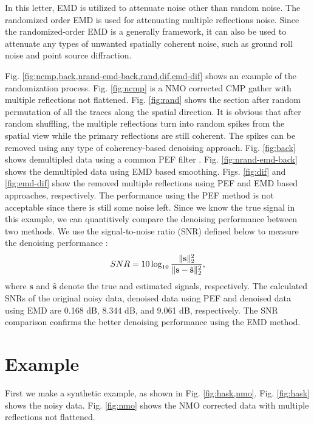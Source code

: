 In this letter, EMD is utilized to attenuate noise other than random noise. The randomized order EMD is used for attenuating multiple reflections noise. Since the randomized-order EMD is a generally framework, it can also be used to attenuate any types of unwanted spatially coherent noise, such as ground roll noise \cite{yangkang2015orthogroll} and point source diffraction.

Fig. \ref{fig:ncmp,back,nrand-emd-back,rand,dif,emd-dif} shows an example of the randomization process. Fig. \ref{fig:ncmp} is a NMO corrected CMP gather with multiple reflections not flattened. Fig.  \ref{fig:rand} shows the section after random permutation of all the traces along the spatial direction. It is obvious that after random shuffling, the multiple reflections turn into random spikes from the spatial view while the primary reflections are still coherent. The spikes can be removed using any type of coherency-based denoising approach. Fig. \ref{fig:back} shows demultipled data using a common PEF filter \cite{Abma1995}. Fig. \ref{fig:nrand-emd-back} shows the demultipled data using EMD based smoothing. Figs. \ref{fig:dif} and \ref{fig:emd-dif} show the removed multiple reflections using PEF and EMD based approaches, respectively. The performance using the PEF method is not acceptable since there is still some noise left. Since we know the true signal in this example, we can quantitively compare the denoising performance between two methods. We use the signal-to-noise ratio (SNR) defined below to measure the denoising performance \cite{yangkang20142,shuwei20153,weilin2016,shaohuan2016}:
\begin{equation}
\label{eq:diff}
SNR=10\log_{10}\frac{\Arrowvert \mathbf{s} \Arrowvert_2^2}{\Arrowvert \mathbf{s} -\hat{\mathbf{s}}\Arrowvert_2^2},
\end{equation}
 where $\mathbf{s}$ and $\hat{\mathbf{s}}$ denote the true and estimated signals, respectively. 
The calculated SNRs of the original noisy data, denoised data using PEF and denoised data using EMD are 0.168 dB, 8.344 dB, and 9.061 dB, respectively. The SNR comparison confirms the better denoising performance using the EMD method.

\section{Example}
First we make a synthetic example, as shown in Fig. \ref{fig:hask,nmo}. Fig. \ref{fig:hask} shows the noisy data. Fig. \ref{fig:nmo} shows the NMO corrected data with multiple reflections not flattened. 

